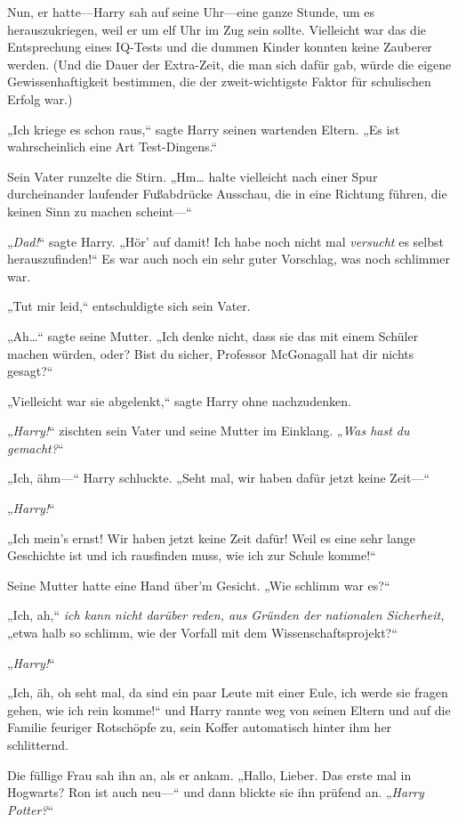 {Nun, er hatte—Harry sah auf seine Uhr—eine ganze Stunde, um es herauszukriegen, weil er um elf Uhr im Zug sein sollte. Vielleicht war das die Entsprechung eines IQ-Tests und die dummen Kinder konnten keine Zauberer werden. (Und die Dauer der Extra-Zeit, die man sich dafür gab, würde die eigene Gewissenhaftigkeit bestimmen, die der zweit-wichtigste Faktor für schulischen Erfolg war.)

„Ich kriege es schon raus,“ sagte Harry seinen wartenden Eltern. „Es ist wahrscheinlich eine Art Test-Dingens.“

Sein Vater runzelte die Stirn. „Hm… halte vielleicht nach einer Spur durcheinander laufender Fußabdrücke Ausschau, die in eine Richtung führen, die keinen Sinn zu machen scheint—“

„\emph{Dad!}“ sagte Harry. „Hör' auf damit! Ich habe noch nicht mal \emph{versucht} es selbst herauszufinden!“ Es war auch noch ein sehr guter Vorschlag, was noch schlimmer war.

„Tut mir leid,“ entschuldigte sich sein Vater.

„Ah…“ sagte seine Mutter. „Ich denke nicht, dass sie das mit einem Schüler machen würden, oder? Bist du sicher, Professor McGonagall hat dir nichts gesagt?“

„Vielleicht war sie abgelenkt,“ sagte Harry ohne nachzudenken.

„\emph{Harry!}“ zischten sein Vater und seine Mutter im Einklang. „\emph{Was hast du gemacht?}“

„Ich, ähm—“ Harry schluckte. „Seht mal, wir haben dafür jetzt keine Zeit—“

„\emph{Harry!}“

„Ich mein's ernst! Wir haben jetzt keine Zeit dafür! Weil es eine sehr lange Geschichte ist und ich rausfinden muss, wie ich zur Schule komme!“

Seine Mutter hatte eine Hand über'm Gesicht. „Wie schlimm war es?“

„Ich, ah,“ \emph{ich kann nicht darüber reden, aus Gründen der nationalen Sicherheit,} „etwa halb so schlimm, wie der Vorfall mit dem Wissenschaftsprojekt?“

„\emph{Harry!}“

„Ich, äh, oh seht mal, da sind ein paar Leute mit einer Eule, ich werde sie fragen gehen, wie ich rein komme!“ und Harry rannte weg von seinen Eltern und auf die Familie feuriger Rotschöpfe zu, sein Koffer automatisch hinter ihm her schlitternd.

Die füllige Frau sah ihn an, als er ankam. „Hallo, Lieber. Das erste mal in Hogwarts? Ron ist auch neu—“ und dann blickte sie ihn prüfend an. „\emph{Harry Potter?}“

}
